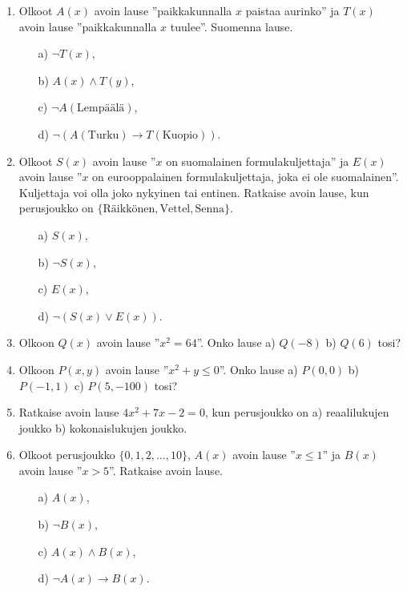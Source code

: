 \Harjoitustehtavat

\begin{enumerate}
\item
Olkoot $A(x)$ avoin lause ''paikkakunnalla $x$ paistaa
aurinko'' ja $T(x)$ avoin lause ''paikkakunnalla $x$
tuulee''. Suomenna lause.
\begin{itemize}
\item[a)] $\lnot T(x)$,
\item[b)] $A(x) \land T(y)$,
\item[c)] $\lnot A(\textrm{Lempäälä})$,
\item[d)] $\lnot (A(\textrm{Turku}) \to T(\textrm{Kuopio}))$.
\end{itemize}

\item
Olkoot $S(x)$ avoin lause ''$x$ on suomalainen
formulakuljettaja'' ja $E(x)$ avoin lause ''$x$ on
eurooppalainen formulakuljettaja, joka ei ole
suomalainen''. Kuljettaja voi olla joko nykyinen tai
entinen. Ratkaise avoin lause, kun perusjoukko on
$\{\textrm{Räikkönen}, \textrm{Vettel}, \textrm{Senna}\}$.
\begin{itemize}
\item[a)] $S(x)$,
\item[b)] $\lnot S(x)$,
\item[c)] $E(x)$,
\item[d)] $\lnot (S(x) \lor E(x))$.
\end{itemize}

\item
Olkoon $Q(x)$ avoin lause ''$x^2 = 64$''. Onko lause a)
$Q(-8)$ b) $Q(6)$ tosi?

\item
Olkoon $P(x, y)$ avoin lause ''$x^2 + y \le 0$''. Onko
lause a) $P(0, 0)$ b) $P(-1, 1)$ c) $P(5, -100)$ tosi?

\item
Ratkaise avoin lause $4x^2 + 7x - 2 = 0$, kun perusjoukko
on a) reaalilukujen joukko b) kokonaislukujen joukko.

\item
Olkoot perusjoukko $\{ 0, 1, 2, \ldots , 10\}$, $A(x)$
avoin lause ''$x \le 1$'' ja $B(x)$ avoin lause ''$x > 5$''.
Ratkaise avoin lause.
\begin{itemize}
\item[a)] $A(x)$,
\item[b)] $\lnot B(x)$,
\item[c)] $A(x) \land B(x)$,
\item[d)] $\lnot A(x) \to B(x)$.
\end{itemize}


\end{enumerate}
